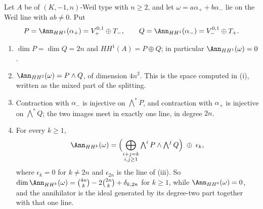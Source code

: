 \begin{theorem}
\label{thm:hhsplitting}
Let $A$ be of $(K,-1,n)$-Weil type with $n\ge2$, and let
$\omega=a\alpha_{+}+b\alpha_{-}$ lie on the Weil line with $ab\ne0$. Put
\[
  P=\Ann_{HH^{1}}(\alpha_{+})=V_{+}^{0,1}\oplus T_{-},
  \qquad
  Q=\Ann_{HH^{1}}(\alpha_{-})=V_{-}^{0,1}\oplus T_{+} .
\]
\begin{enumerate}[label=\textup{(\roman*)},leftmargin=2.6em,itemsep=2pt]
\item $\dim P=\dim Q=2n$ and $HH^{1}(A)=P\oplus Q$; in particular
  $\Ann_{HH^{1}}(\omega)=0$.
\item $\Ann_{HH^{2}}(\omega)=P\wedge Q$, of dimension $4n^{2}$. This is the
  space computed in (i), written as the mixed part of the
  splitting.
\item Contraction with $\alpha_{-}$ is injective on $\bigwedge^{*}P$, and
  contraction with $\alpha_{+}$ is injective on $\bigwedge^{*}Q$; the two
  images meet in exactly one line, in degree $2n$.
\item For every $k\ge1$,
  \[
    \Ann_{HH^{k}}(\omega)
    =\Bigl(\bigoplus_{\substack{i+j=k\\ i,j\ge1}}
      \textstyle\bigwedge^{i}P\wedge\bigwedge^{j}Q\Bigr)\;\oplus\;\epsilon_{k},
  \]
  where $\epsilon_{k}=0$ for $k\ne2n$ and $\epsilon_{2n}$ is the line of
  \textup{(iii)}. So
  $\dim\Ann_{HH^{k}}(\omega)=\binom{4n}{k}-2\binom{2n}{k}+\delta_{k,2n}$ for
  $k\ge1$, while $\Ann_{HH^{0}}(\omega)=0$, and the annihilator is the ideal
  generated by its degree-two part together with that one line.
\end{enumerate}
\end{theorem}

